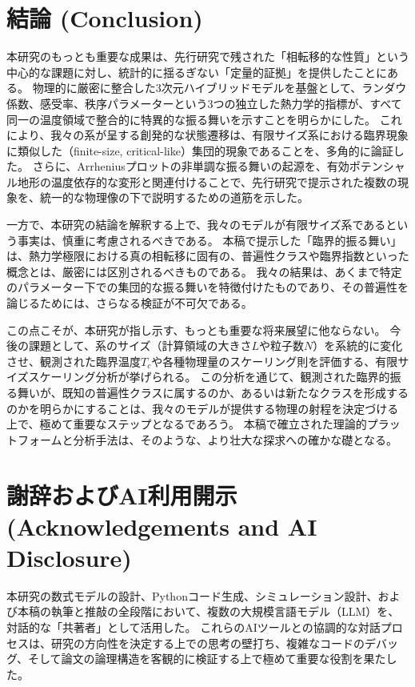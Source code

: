 \documentclass[a4paper,11pt,ja=standard,lualatex]{bxjsarticle}
\begin{document}
\FloatBarrier

\section{結論 (Conclusion)}
\label{sec:conclusion}
本研究のもっとも重要な成果は、先行研究で残された「相転移的な性質」という中心的な課題に対し、統計的に揺るぎない「定量的証拠」を提供したことにある。
物理的に厳密に整合した3次元ハイブリッドモデルを基盤として、ランダウ係数、感受率、秩序パラメーターという3つの独立した熱力学的指標が、すべて同一の温度領域で整合的に特異的な振る舞いを示すことを明らかにした。
これにより、我々の系が呈する創発的な状態遷移は、有限サイズ系における臨界現象に類似した（finite-size, critical-like）集団的現象であることを、多角的に論証した。
さらに、Arrheniusプロットの非単調な振る舞いの起源を、有効ポテンシャル地形の温度依存的な変形と関連付けることで、先行研究で提示された複数の現象を、統一的な物理像の下で説明するための道筋を示した。

一方で、本研究の結論を解釈する上で、我々のモデルが有限サイズ系であるという事実は、慎重に考慮されるべきである。
本稿で提示した「臨界的振る舞い」は、熱力学極限における真の相転移に固有の、普遍性クラスや臨界指数といった概念とは、厳密には区別されるべきものである。
我々の結果は、あくまで特定のパラメーター下での集団的な振る舞いを特徴付けたものであり、その普遍性を論じるためには、さらなる検証が不可欠である。

この点こそが、本研究が指し示す、もっとも重要な将来展望に他ならない。
今後の課題として、系のサイズ（計算領域の大きさ$L$や粒子数$N$）を系統的に変化させ、観測された臨界温度$T_c$や各種物理量のスケーリング則を評価する、有限サイズスケーリング分析が挙げられる。
この分析を通じて、観測された臨界的振る舞いが、既知の普遍性クラスに属するのか、あるいは新たなクラスを形成するのかを明らかにすることは、我々のモデルが提供する物理の射程を決定づける上で、極めて重要なステップとなるであろう。
本稿で確立された理論的プラットフォームと分析手法は、そのような、より壮大な探求への確かな礎となる。

\FloatBarrier

\section*{謝辞およびAI利用開示 (Acknowledgements and AI Disclosure)}
本研究の数式モデルの設計、Pythonコード生成、シミュレーション設計、および本稿の執筆と推敲の全段階において、複数の大規模言語モデル（LLM）を、対話的な「共著者」として活用した。
これらのAIツールとの協調的な対話プロセスは、研究の方向性を決定する上での思考の壁打ち、複雑なコードのデバッグ、そして論文の論理構造を客観的に検証する上で極めて重要な役割を果たした。
\end{document}
